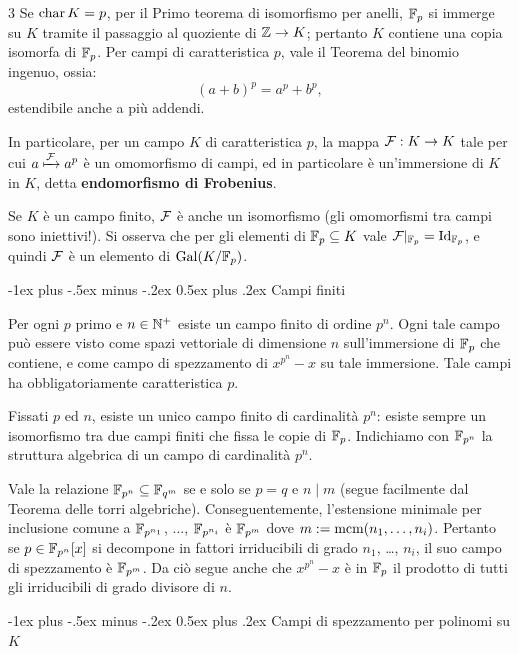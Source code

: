 \documentclass[10pt,landscape]{article}
\makeatletter
\renewcommand{\section}{\@startsection{section}{1}{0mm}%
	{-1ex plus -.5ex minus -.2ex}%
	{0.5ex plus .2ex}%
	{\normalfont\large\bfseries}}
\makeatother
\begin{document}
\begin{multicols}{3}
	Se $\operatorname{char} K = p$, per il Primo
	teorema di isomorfismo per anelli, $\mathbb F_p$ si immerge
	su $K$ tramite il passaggio al quoziente di $\mathbb Z \to K$; pertanto
	$K$ contiene una copia isomorfa di $\mathbb F_p$. Per
	campi di caratteristica $p$, vale il Teorema del
	binomio ingenuo, ossia:
	\[ (a + b)^p = a^p + b^p, \]
	estendibile anche a più addendi. \smallskip

	In particolare, per un campo $K$ di caratteristica $p$,
	la mappa $\mathcal{F} : K \to K$ tale per cui $a \xmapsto{\mathcal{F}} a^p$
	è un omomorfismo di campi, ed in particolare è un'immersione
	di $K$ in $K$, detta \textbf{endomorfismo di Frobenius}. \smallskip

	Se $K$ è un campo finito, $\mathcal{F}$ è anche
	un isomorfismo (gli omomorfismi tra campi sono iniettivi!).
	Si osserva che per gli elementi di $\mathbb F_p \subseteq K$ vale
	$\mathcal{F}\arrowvert_{\mathbb F_p} = \mathrm{Id}_{\mathbb F_p}$, e quindi
	$\mathcal{F}$ è un elemento di $\operatorname{Gal}(K / \mathbb F_p)$.

	\section{Campi finiti}

	Per ogni $p$ primo e $n \in \mathbb N^+$ esiste un campo finito
	di ordine $p^n$. Ogni tale campo può essere visto
	come spazi vettoriale di dimensione $n$ sull'immersione di $\mathbb F_p$ che contiene,
	e come campo di spezzamento di $x^{p^n}-x$
	su tale immersione. Tale campi ha obbligatoriamente
	caratteristica $p$. \smallskip

	Fissati $p$ ed $n$, esiste un unico campo finito di cardinalità
	$p^n$: esiste sempre un isomorfismo tra due campi finiti che
	fissa le copie di $\mathbb F_p$. Indichiamo con $\mathbb F_{p^n}$ la struttura
	algebrica di un campo di cardinalità $p^n$. \smallskip

	Vale la relazione $\mathbb F_{p^n} \subseteq \mathbb F_{q^m}$
	se e solo se $p=q$ e $n \mid m$ (segue facilmente dal Teorema
	delle torri algebriche). Conseguentemente,
	l'estensione minimale per inclusione comune a
	$\mathbb F_{p^{n_1}}$, ..., $\mathbb F_{p^{n_i}}$ è
	$\mathbb F_{p^m}$ dove $m := \operatorname{mcm}(n_1, \ldots, n_i)$. Pertanto
	se $p \in \mathbb F_{p^n}[x]$ si decompone in fattori irriducibili
	di grado $n_1$, \ldots, $n_i$, il suo campo di spezzamento
	è $\mathbb F_{p^m}$. Da ciò segue anche che $x^{p^n}-x$ è in $\mathbb F_p$ il
	prodotto di tutti gli irriducibili di grado divisore
	di $n$.

	\section{Campi di spezzamento per polinomi su \texorpdfstring{$K$}{K}}


\end{multicols}
\end{document}
